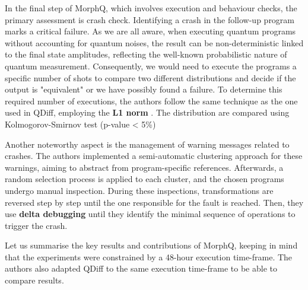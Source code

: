 \begin{itemize}
In the final step of MorphQ, which involves execution and behaviour checks, the primary assessment is crash check. Identifying a crash in the follow-up program marks a critical failure. As we are all aware, when executing quantum programs without accounting for quantum noises, the result can be non-deterministic linked to the final state amplitudes, reflecting the well-known probabilistic nature of quantum measurement. Consequently, we would need to execute the programs a specific number of shots to compare two different distributions and decide if the output is "equivalent" or we have possibly found a failure. To determine this 
required number of executions, the authors follow the same technique as the one used in QDiff, employing the \textbf{L1 norm }\cite{chan2014optimal}. The distribution are compared using Kolmogorov-Smirnov test (p-value < 5\%)\newline
 
Another noteworthy aspect is the management of warning messages related to crashes. The authors implemented a semi-automatic clustering approach for these warnings, aiming to abstract from program-specific references. Afterwards, a random selection process is applied to each cluster, and the chosen programs undergo manual inspection. During these inspections, transformations are reversed step by step until the one responsible for the fault is reached. Then, they use \textbf{delta debugging} until they identify the minimal sequence of operations to trigger the crash. \newline

Let us summarise the key results and contributions of MorphQ, keeping in mind that the experiments were constrained by a 48-hour execution time-frame. The authors also adapted QDiff to the same execution time-frame to be able to compare results.


\end{itemize}

